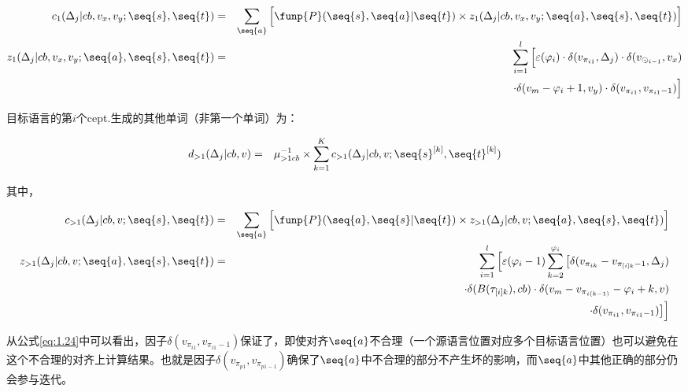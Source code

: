 \begin{appendices}
\begin{eqnarray}
c_1(\Delta_j|cb,v_x,v_y;\seq{s},\seq{t})                   & = & \sum_{\seq{a}}\Big[ \funp{P}(\seq{s},\seq{a}|\seq{t}) \times z_1(\Delta_j|cb,v_x,v_y;\seq{a},\seq{s},\seq{t}) \Big] \label{eq:1.24} \\
z_1(\Delta_j|cb,v_x,v_y;\seq{a},\seq{s},\seq{t}) & = & \sum_{i=1}^l \Big [ \varepsilon(\varphi_i) \cdot \delta(v_{\pi_{i1}},\Delta_j) \cdot \delta(v_{\odot _{i-1}},v_x) \nonumber \\
                                                                                          &    & \cdot \delta(v_m-\varphi_i+1,v_y) \cdot \delta(v_{\pi_{i1}},v_{\pi_{i1}-1} )\Big] \label{eq:1.25}
\end{eqnarray}


\noindent 目标语言的第$i$个cept.生成的其他单词（非第一个单词）为：

\begin{eqnarray}
d_{>1}(\Delta_j|cb,v) &=& \mu_{>1cb}^{-1} \times \sum_{k=1}^{K}c_{>1}(\Delta_j|cb,v;\seq{s}^{[k]},\seq{t}^{[k]})
\label{eq:1.26}
\end{eqnarray}

\noindent 其中，

\begin{eqnarray}
c_{>1}(\Delta_j|cb,v;\seq{s},\seq{t})                   & =  & \sum_{\seq{a}}\Big[\funp{P}(\seq{a},\seq{s}|\seq{t}) \times z_{>1}(\Delta_j|cb,v;\seq{a},\seq{s},\seq{t}) \Big] \label{eq:1.27} \\
z_{>1}(\Delta_j|cb,v;\seq{a},\seq{s},\seq{t}) & = & \sum_{i=1}^l\Big[\varepsilon(\varphi_i-1)\sum_{k=2}^{\varphi_i} \big[\delta(v_{\pi_{ik}}-v_{\pi_{[i]k}-1},\Delta_j)  \nonumber \\
                                                                                    &     & \cdot \delta(B(\tau_{[i]k}) ,cb) \cdot \delta(v_m-v_{\pi_{i(k-1)}}-\varphi_i+k,v) \nonumber \\
                                                                                    &     & \cdot \delta(v_{\pi_{i1}},v_{\pi_{i1}-1}) \big] \Big] \label{eq:1.28}
\end{eqnarray}

\vspace{0.5em}

\parinterval 从公式\eqref{eq:1.24}中可以看出，因子$\delta(v_{\pi_{i1}},v_{\pi_{i1}-1})$保证了，即使对齐$\seq{a}$不合理（一个源语言位置对应多个目标语言位置）也可以避免在这个不合理的对齐上计算结果。也就是因子$\delta(v_{\pi_{p1}},v_{\pi_{p1-1}})$确保了$\seq{a}$中不合理的部分不产生坏的影响，而$\seq{a}$中其他正确的部分仍会参与迭代。


\end{appendices}
